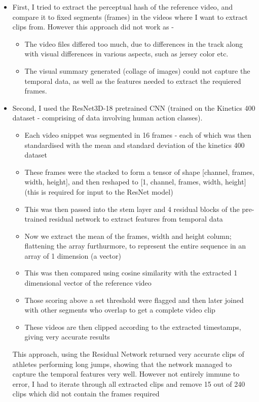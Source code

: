 \documentclass[12pt, letterpaper]{article}
\begin{document}
 \begin{itemize}
    \item First, I tried to extract the perceptual hash of the reference video, 
    and compare it to fixed segments (frames) in the videos where I want to extract 
    clips from. However this approach did not work as - 
    \begin{itemize}
        \item The video files differed too much, due to differences in the track 
        along with visual differences in various aspects, such as jersey color etc.
        \item The visual summary generated (collage of images) could not capture the temporal data, 
        as well as the features needed to extract the requiered frames.
    \end{itemize}
    \item Second, I used the ResNet3D-18 pretrained CNN (trained on the Kinetics 400 dataset - comprising of data involving 
    human action classes). 
    \begin{itemize}
        \item Each video snippet was segmented in 16 frames - each of which was then standardised with the mean and standard deviation of the kinetics 400 dataset
        \item These frames were the stacked to form a tensor of shape [channel, frames, width, height], and then reshaped to [1, channel, frames, width, height] (this is required for input to the ResNet model)
        \item This was then passed into the stem layer and 4 residual blocks of the pre-trained residual network to extract features from temporal data
        \item Now we extract the mean of the frames, width and height column; flattening the array furthurmore, to represent the entire sequence in an array of 1 dimension (a vector)
        \item This was then compared using cosine similarity with the extracted 1 dimensional vector of the reference video
        \item Those scoring above a set threshold were flagged and then later joined with other segments who overlap to get a complete video clip
        \item These videos are then clipped according to the extracted timestamps, giving very accurate results
    \end{itemize}
    This approach, using the Residual Network returned very accurate clips of athletes performing long jumps, showing
    that the network managed to capture the temporal features very well. However not entirely immune to error, I had to iterate through all extracted clips and remove 15 out of 240 clips which did not contain the frames required
 \end{itemize}
\end{document}
